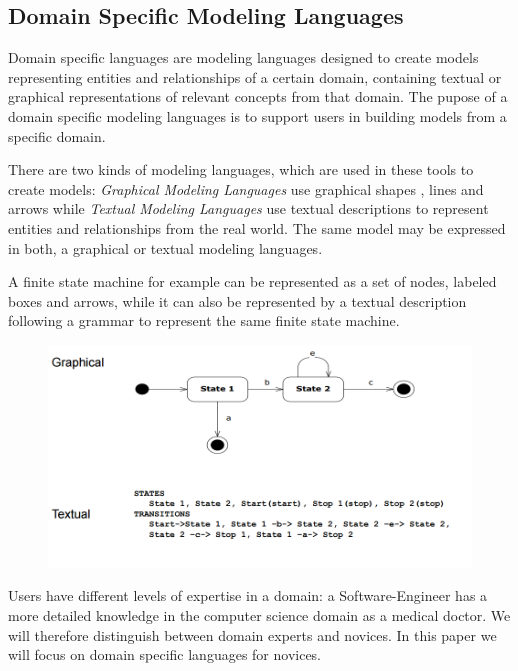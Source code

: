 \documentclass[runningheads,a4paper]{llncs}
\begin{document}
 \subsection{Domain Specific Modeling Languages}
 Domain specific languages are modeling languages designed to create models representing entities and relationships of a certain domain,
 containing textual or graphical representations of relevant concepts from that domain. The pupose of a domain specific modeling languages
 is to support users in building models from a specific domain.
 
 There are two kinds of modeling languages, which are used in these tools to create models:
 \emph{Graphical Modeling Languages} use graphical shapes , lines and arrows  while
 \emph{Textual Modeling Languages} use textual descriptions to represent entities and relationships from the real world.
 The same model may be expressed in both, a graphical or textual modeling languages.
 
 A finite state machine for example can be represented as a set of nodes, labeled boxes and arrows, while it can also be 
 represented by a textual description following a grammar to represent the same finite state machine.
 
  \begin{figure}[H]
      \centering
      \includegraphics[width=\textwidth]{images/GraficalTextualComparison.PNG}
      \label{compare:textgraphiclang}
    \end{figure}

 Users have different levels of expertise in a domain: a Software-Engineer has a more detailed knowledge in the computer science domain as a medical doctor.
 We will therefore distinguish between domain experts and novices.  In this paper we will focus on domain specific languages for novices.
 
\end{document}
